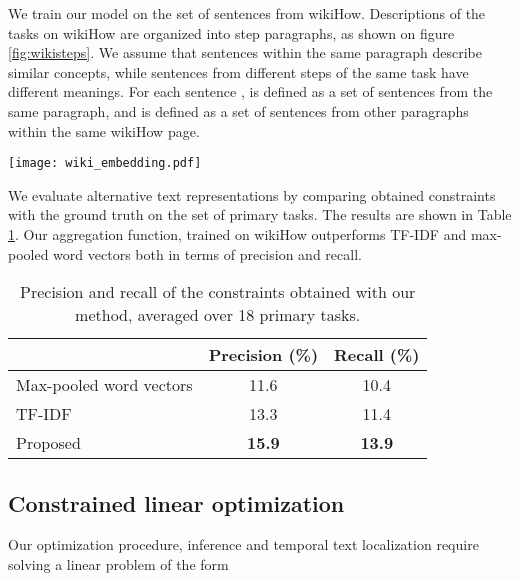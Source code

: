 \documentclass[10pt,twocolumn,letterpaper]{article}
\begin{document}
We train our model on the set of sentences from wikiHow.
Descriptions of the tasks on wikiHow are organized into step paragraphs, as shown on figure \ref{fig:wikisteps}.
We assume that sentences within the same paragraph describe similar concepts, while sentences from different steps of the same task have different meanings.
For each sentence ,  is defined as a set of sentences from the same paragraph, and  is defined as a set of sentences from other paragraphs within the same wikiHow page.

\begin{figure*}[t]
\begin{center}
   \texttt{[image: wiki\_embedding.pdf]}
   \caption{Example of three wikiHow steps for the \textit{Change a Tire} task. Our method learns a similarity function that pulls representations of the sentences from the same paragraphs closer together, and pushes the sentences from different paragraphs away from each other}
   \label{fig:wikisteps}
\end{center}
\vspace{-0.2in}
\end{figure*}

We evaluate alternative text representations by comparing obtained constraints with the ground truth on the set of primary tasks.
The results are shown in Table \ref{tab:constr_eval}.
Our aggregation function, trained on wikiHow outperforms TF-IDF and max-pooled word vectors both in terms of precision and recall.

\begin{table}[]
\caption{Precision and recall of the constraints obtained with our method, averaged over 18 primary tasks.}
\label{tab:constr_eval}
\begin{tabular}{@{}lcc@{}}
\toprule
 & Precision (\%) & Recall (\%) \\
\midrule
Max-pooled word vectors & 11.6 & 10.4 \\
TF-IDF & 13.3 & 11.4 \\
Proposed & \textbf{15.9} & \textbf{13.9} \\
\bottomrule
\end{tabular}
\vspace{-0.1in}
\end{table}

\subsection{Constrained linear optimization}
\label{subsec:dl}
Our optimization procedure, inference and temporal text localization require solving a linear problem of the form
\end{document}
